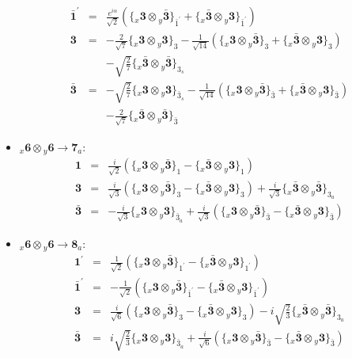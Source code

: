 \documentclass[english]{article}
\newcommand{\rep}[1]{\mathbf{#1}}
\newcommand{\repx}[2]{{}_{#2}\mathbf{#1}}
\newcommand{\subcg}[3]{\big\{ \repx{#1}{x}\otimes\repx{#2}{y}\big\}^{}_{#3}}
\begin{document}
\begin{itemize}
\begin{eqnarray*}
\\
\rep{\bar{1}^{\prime}} &=& \frac{e^{i \alpha }}{\sqrt{2}}\left(\subcg{3}{\bar{3}}{\bar{1}^{\prime}}+\subcg{\bar{3}}{3}{\bar{1}^{\prime}}\right)
\\
\rep{3} &=& -\frac{2}{\sqrt{7}}\subcg{3}{3}{3}-\frac{1}{\sqrt{14}}\left(\subcg{3}{\bar{3}}{3}+\subcg{\bar{3}}{3}{3}\right) \\ 
 & & -\sqrt{\frac{2}{7}}\subcg{\bar{3}}{\bar{3}}{3_{s}}
\\
\rep{\bar{3}} &=& -\sqrt{\frac{2}{7}}\subcg{3}{3}{\bar{3}_{s}}-\frac{1}{\sqrt{14}}\left(\subcg{3}{\bar{3}}{\bar{3}}+\subcg{\bar{3}}{3}{\bar{3}}\right) \\ 
 & & -\frac{2}{\sqrt{7}}\subcg{\bar{3}}{\bar{3}}{\bar{3}}
\end{eqnarray*}
\item $\repx{6}{x}\otimes\repx{6}{y}\to\rep{7}_{a}$:
\begin{eqnarray*}
\rep{1} &=& \frac{i}{\sqrt{2}}\left(\subcg{3}{\bar{3}}{1}-\subcg{\bar{3}}{3}{1}\right)
\\
\rep{3} &=& \frac{i}{\sqrt{3}}\left(\subcg{3}{\bar{3}}{3}-\subcg{\bar{3}}{3}{3}\right)+\frac{i}{\sqrt{3}}\subcg{\bar{3}}{\bar{3}}{3_{a}}
\\
\rep{\bar{3}} &=& -\frac{i}{\sqrt{3}}\subcg{3}{3}{\bar{3}_{a}}+\frac{i}{\sqrt{3}}\left(\subcg{3}{\bar{3}}{\bar{3}}-\subcg{\bar{3}}{3}{\bar{3}}\right)
\end{eqnarray*}
\item $\repx{6}{x}\otimes\repx{6}{y}\to\rep{8}_{a}$:
\begin{eqnarray*}
\rep{1^{\prime}} &=& \frac{1}{\sqrt{2}}\left(\subcg{3}{\bar{3}}{1^{\prime}}-\subcg{\bar{3}}{3}{1^{\prime}}\right)
\\
\rep{\bar{1}^{\prime}} &=& -\frac{1}{\sqrt{2}}\left(\subcg{3}{\bar{3}}{\bar{1}^{\prime}}-\subcg{\bar{3}}{3}{\bar{1}^{\prime}}\right)
\\
\rep{3} &=& \frac{i}{\sqrt{6}}\left(\subcg{3}{\bar{3}}{3}-\subcg{\bar{3}}{3}{3}\right)-i \sqrt{\frac{2}{3}}\subcg{\bar{3}}{\bar{3}}{3_{a}}
\\
\rep{\bar{3}} &=& i \sqrt{\frac{2}{3}}\subcg{3}{3}{\bar{3}_{a}}+\frac{i}{\sqrt{6}}\left(\subcg{3}{\bar{3}}{\bar{3}}-\subcg{\bar{3}}{3}{\bar{3}}\right)
\end{eqnarray*}
\end{itemize}
\end{document}
